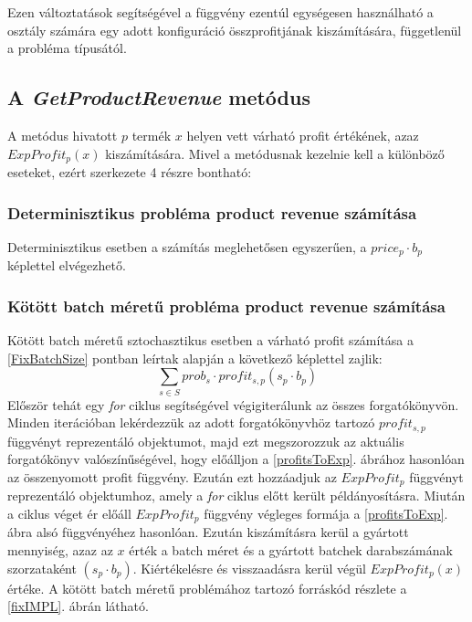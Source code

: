 Ezen változtatások segítségével a  függvény ezentúl egységesen használható a  osztály számára egy adott konfiguráció összprofitjának kiszámítására, függetlenül a probléma típusától. 
\subsection{A \textit{GetProductRevenue} metódus} \label{getProductRevenue}
A  metódus hivatott $p$ termék $x$ helyen vett várható profit értékének, azaz $ExpProfit_p(x)$ kiszámítására.
Mivel a metódusnak kezelnie kell a különböző eseteket, ezért szerkezete 4 részre bontható:
\subsubsection{Determinisztikus probléma product revenue számítása}
Determinisztikus esetben a számítás meglehetősen egyszerűen, a $price_p \cdot b_p$ képlettel elvégezhető.
\subsubsection{Kötött batch méretű probléma product revenue számítása}
Kötött batch méretű sztochasztikus esetben a várható profit számítása a \ref{FixBatchSize} pontban leírtak alapján a következő képlettel zajlik: $$\sum_{s \in S} prob_s \cdot profit_{s,p} (s_p \cdot b_p)$$
Először tehát egy \textit{for} ciklus segítségével végigiterálunk az összes forgatókönyvön.
Minden iterációban lekérdezzük az adott forgatókönyvhöz tartozó $profit_{s,p}$ függvényt reprezentáló  objektumot, majd ezt megszorozzuk az aktuális forgatókönyv valószínűségével, hogy előálljon a \ref{profitsToExp}. ábrához hasonlóan az összenyomott profit függvény.
Ezután ezt hozzáadjuk az $ExpProfit_p$ függvényt reprezentáló  objektumhoz, amely a \textit{for} ciklus előtt került példányosításra.
Miután a ciklus véget ér előáll  $ExpProfit_p$ függvény végleges formája a \ref{profitsToExp}. ábra alsó függvényéhez hasonlóan.
Ezután kiszámításra kerül a gyártott mennyiség, azaz az $x$ érték a batch méret és a gyártott batchek darabszámának szorzataként $(s_p \cdot b_p)$.
Kiértékelésre és visszaadásra kerül végül $ExpProfit_p(x)$ értéke.
A kötött batch méretű problémához tartozó forráskód részlete a \ref{fixIMPL}. ábrán látható.
